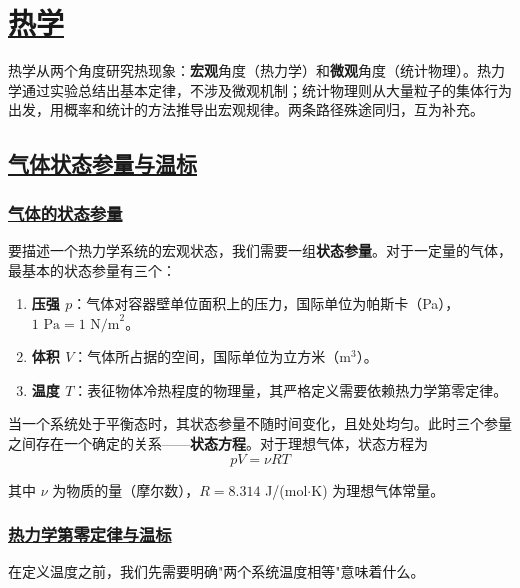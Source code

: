 \chapter{\protect\hyperlink{:}{热学}}


热学从两个角度研究热现象：\textbf{宏观}角度（热力学）和\textbf{微观}角度（统计物理）。热力学通过实验总结出基本定律，不涉及微观机制；统计物理则从大量粒子的集体行为出发，用概率和统计的方法推导出宏观规律。两条路径殊途同归，互为补充。


\section{\protect\hyperlink{:}{气体状态参量与温标}}

\subsection{\protect\hyperlink{:}{气体的状态参量}}

要描述一个热力学系统的宏观状态，我们需要一组\textbf{状态参量}。对于一定量的气体，最基本的状态参量有三个：

\begin{enumerate}
    \item \textbf{压强 $p$}：气体对容器壁单位面积上的压力，国际单位为帕斯卡（Pa），$1\text{ Pa} = 1\text{ N/m}^2$。
    \item \textbf{体积 $V$}：气体所占据的空间，国际单位为立方米（m$^3$）。
    \item \textbf{温度 $T$}：表征物体冷热程度的物理量，其严格定义需要依赖热力学第零定律。
\end{enumerate}

当一个系统处于平衡态时，其状态参量不随时间变化，且处处均匀。此时三个参量之间存在一个确定的关系——\textbf{状态方程}。对于理想气体，状态方程为
\begin{equation}
    pV = \nu RT
\end{equation}

其中 $\nu$ 为物质的量（摩尔数），$R = 8.314$ J/(mol$\cdot$K) 为理想气体常量。

\subsection{\protect\hyperlink{:}{热力学第零定律与温标}}

在定义温度之前，我们先需要明确"两个系统温度相等"意味着什么。

